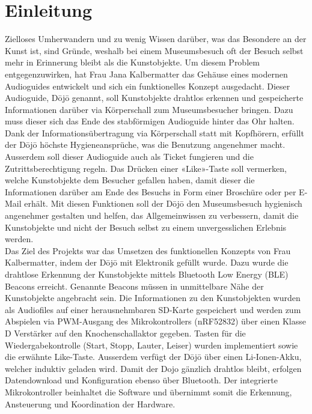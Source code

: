 \section{Einleitung}\label{sec:einleitung}
Zielloses Umherwandern und zu wenig Wissen darüber, was das Besondere an der Kunst ist, sind Gründe, weshalb bei einem Museumsbesuch oft der Besuch selbst mehr in Erinnerung bleibt als die Kunstobjekte. Um diesem Problem entgegenzuwirken, hat Frau Jana Kalbermatter das Gehäuse eines modernen Audioguides entwickelt und sich ein funktionelles Konzept ausgedacht. Dieser Audioguide, Dōjō genannt, soll Kunstobjekte drahtlos erkennen und gespeicherte Informationen darüber via Körperschall zum Museumsbesucher bringen. Dazu muss dieser sich das Ende des stabförmigen Audioguide hinter das Ohr halten. Dank der Informationsübertragung via Körperschall statt mit Kopfhörern, erfüllt der Dōjō höchste Hygieneansprüche, was die Benutzung angenehmer macht. Ausserdem soll dieser Audioguide auch als Ticket fungieren und die Zutrittsberechtigung regeln. Das Drücken einer «Like»-Taste soll vermerken, welche Kunstobjekte dem Besucher gefallen haben, damit dieser die Informationen darüber am Ende des Besuchs in Form einer Broschüre oder per E-Mail erhält. Mit diesen Funktionen soll der Dōjō den Museumsbesuch hygienisch angenehmer gestalten und helfen, das Allgemeinwissen zu verbessern, damit die Kunstobjekte und nicht der Besuch selbst zu einem unvergesslichen Erlebnis werden.\\
Das Ziel des Projekts war das Umsetzen des funktionellen Konzepts von Frau Kalbermatter, indem der Dōjō mit Elektronik gefüllt wurde. Dazu wurde die drahtlose Erkennung der Kunstobjekte mittels Bluetooth Low Energy (BLE) Beacons erreicht. Genannte Beacons müssen in unmittelbare Nähe der Kunstobjekte angebracht sein. Die Informationen zu den Kunstobjekten wurden als Audiofiles auf einer herausnehmbaren SD-Karte gespeichert und werden zum Abspielen via PWM-Ausgang des Mikrokontrollers (nRF52832) über einen Klasse D Verstärker auf den Knochenschallaktor gegeben. Tasten für die Wiedergabekontrolle (Start, Stopp, Lauter, Leiser) wurden implementiert sowie die erwähnte \glqq Like\grqq -Taste. Ausserdem verfügt der Dōjō über einen Li-Ionen-Akku, welcher induktiv geladen wird. Damit der Dojo gänzlich drahtlos bleibt, erfolgen Datendownload und Konfiguration ebenso über Bluetooth. Der integrierte Mikrokontroller beinhaltet die Software und übernimmt somit die Erkennung, Ansteuerung und Koordination der Hardware.\\
